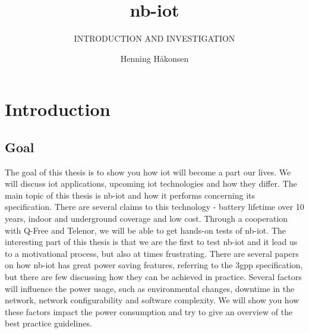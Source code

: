 \documentclass[USenglish]{ifimaster}  %
\title{\acrlong{nb-iot}}
\subtitle{INTRODUCTION AND INVESTIGATION}
\author{Henning Håkonsen}
\begin{document}
\duoforside[dept={Department of Informatics},   %
  program={Network and system administration},  %
  long]                                        %

\frontmatter{}
\tableofcontents

\newpage
\lstlistoflistings

\newpage
\listoffigures

\newpage
\listoftables

\cleardoublepage


\cleardoublepage


\mainmatter{}
\chapter{Introduction}

\section{Goal}
The goal of this thesis is to show you how \acrshort{iot} will become a part our lives. We will discuss \acrshort{iot} applications, upcoming \acrshort{iot} technologies and how they differ. The main topic of this thesis is \acrshort{nb-iot} and how it performs concerning its specification. There are several claims to this technology - battery lifetime over 10 years, indoor and underground coverage and low cost. Through a cooperation with Q-Free and Telenor, we will be able to get hands-on tests of \acrshort{nb-iot}. The interesting part of this thesis is that we are the first to test \acrshort{nb-iot} and it lead us to a motivational process, but also at times frustrating. There are several papers on how \acrshort{nb-iot} has great power saving features, referring to the \acrshort{3gpp} specification, but there are few discussing how they can be achieved in practice. Several factors will influence the power usage, such as environmental changes, downtime in the network, network configurability and software complexity. We will show you how these factors impact the power consumption and try to give an overview of the best practice guidelines.
\end{document}

